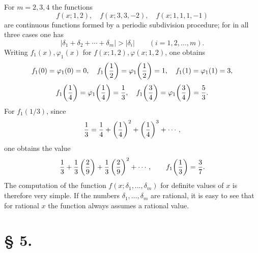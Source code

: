\documentclass[11pt,a4paper]{article}
\begin{document}
For $m=2,3,4$ the functions
\[
 f(x;1,2),\quad f(x;3,3,-2),\quad f(x;1,1,1,-1)
\]
are continuous functions formed by a periodic subdivision procedure; for in all three cases one has
\[
 |\delta_1+\delta_2+\cdots+\delta_m|>|\delta_i|
 \qquad (i=1,2,\ldots,m).
\]
Writing $f_1(x),\varphi_1(x)$ for $f(x;1,2),\varphi(x;1,2)$, one obtains
\[
 f_1(0)=\varphi_1(0)=0,
 \quad
 f_1\!\left({1\over2}\right)=\varphi_1\!\left({1\over2}\right)=1,
 \quad
 f_1(1)=\varphi_1(1)=3,
\]
\[
 f_1\!\left({1\over4}\right)=\varphi_1\!\left({1\over4}\right)={1\over3},
 \quad
 f_1\!\left({3\over4}\right)=\varphi_1\!\left({3\over4}\right)={5\over3}.
\]
For $f_1(1/3)$, since
\[
 {1\over3}={1\over4}+\left({1\over4}\right)^2+\left({1\over4}\right)^3+\cdots,
\]
one obtains the value
\[
 {1\over3}+{1\over3}\left({2\over9}\right)+{1\over3}\left({2\over9}\right)^2+\cdots,
 \qquad
 f_1\!\left({1\over3}\right)={3\over7}.
\]
The computation of the function $f(x;\delta_1,\ldots,\delta_m)$ for definite values of $x$ is therefore very simple. If the numbers $\delta_1,\ldots,\delta_m$ are rational, it is easy to see that for rational $x$ the function always assumes a rational value.

\section*{§ 5.}
\end{document}
